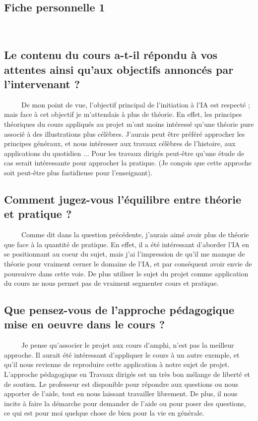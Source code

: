 \documentclass[a4paper,12pt]{report}
\begin{document}
\begin{center}
\section*{Fiche personnelle 1}
\end{center}
\ \ \\
\subsection*{Le contenu du cours a-t-il répondu à vos attentes ainsi qu’aux objectifs annoncés par l’intervenant ?}
\ \ \ \ \ De mon point de vue, l'objectif principal de l'initiation à l'IA est respecté ; mais face à cet objectif je m'attendais à plus de théorie. En effet, les principes théoriques du cours appliqués au projet m'ont moins intéressé qu'une théorie pure associé à des illustrations plus célèbres. J'aurais peut être préféré approcher les principes généraux, et nous intéresser aux travaux célèbres de l'histoire, aux applications du quotidien ... Pour les travaux dirigés peut-être qu'une étude de cas serait intéressante pour approcher la pratique. (Je conçois que cette approche soit peut-être plus fastidieuse pour l'enseignant).
\subsection*{Comment jugez-vous l’équilibre entre théorie et pratique ?}
\ \ \ \ \ Comme dit dans la question précédente, j'aurais aimé avoir plus de théorie que face à la quantité de pratique. En effet, il a été intéressant d'aborder l'IA en se positionnant au coeur du sujet, mais j'ai l'impression de qu'il me manque de théorie pour vraiment cerner le domaine de l'IA, et par conséquent avoir envie de poursuivre dans cette voie. De plus utiliser le sujet du projet comme application du cours ne nous permet pas de vraiment segmenter cours et pratique.
\subsection*{Que pensez-vous de l’approche pédagogique mise en oeuvre dans le cours ?}
\ \ \ \ \ Je pense qu'associer le projet aux cours d'amphi, n'est pas la meilleur approche. Il aurait été intéressant d'appliquer le cours à un autre exemple, et qu'il nous revienne de reproduire cette application à notre sujet de projet. \\
L'approche pédagogique en Travaux dirigés est un très bon mélange de liberté et de soutien. Le professeur est disponible pour répondre aux questions ou nous apporter de l'aide, tout en nous laissant travailler librement. De plus, il nous incite à faire la démarche pour demander de l'aide ou pour poser des questions, ce qui est pour moi quelque chose de bien pour la vie en générale.
\end{document}
